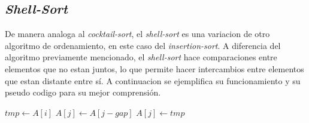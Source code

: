 \documentclass[12pt,twoside]{article}
\begin{document}
\subsection{\textit{Shell-Sort}}
De manera analoga al \textit{cocktail-sort}, el \textit{shell-sort} es una variacion de otro algoritmo de ordenamiento, en este caso del \textit{insertion-sort}. A diferencia del algoritmo previamente mencionado, el \textit{shell-sort} hace comparaciones entre elementos que no estan juntos, lo que permite hacer intercambios entre elementos que estan distante entre s\'i.
A continuacion se ejemplifica su funcionamiento y su pseudo codigo para su mejor comprensi\'on.
\begin{algorithmic}
            \State $tmp \longleftarrow A[i]$
                \State $A[j] \longleftarrow A[j - gap]$
            \EndFor
            \State $A[j] \longleftarrow tmp$
        \EndFor
    \EndFor
\EndProcedure
\end{algorithmic}
\end{document}

